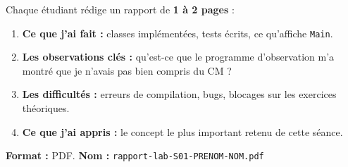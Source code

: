 \documentclass[11pt,a4paper]{article}
\begin{document}
\begin{attentionbox}
Chaque étudiant rédige un rapport de \textbf{1 à 2 pages} :
\begin{enumerate}[nosep]
    \item \textbf{Ce que j'ai fait :} classes implémentées, tests écrits, ce
          qu'affiche \texttt{Main}.
    \item \textbf{Les observations clés :} qu'est-ce que le programme
          d'observation m'a montré que je n'avais pas bien compris du CM ?
    \item \textbf{Les difficultés :} erreurs de compilation, bugs, blocages
          sur les exercices théoriques.
    \item \textbf{Ce que j'ai appris :} le concept le plus important retenu
          de cette séance.
\end{enumerate}
\textbf{Format :} PDF. \textbf{Nom :} \texttt{rapport-lab-S01-PRENOM-NOM.pdf}
\end{attentionbox}
\end{document}
